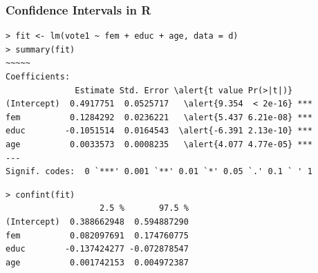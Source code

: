 \documentclass[xcolor=svgnames,9pt,english,aspectratio=169,t]{beamer}
\begin{document}

\begin{frame}[fragile]
\frametitle{Confidence Intervals in R}

\begin{Verbatim}[fontsize=\footnotesize, frame=single, label=R Code, commandchars=\\\{\}]
> fit <- lm(vote1 ~ fem + educ + age, data = d)
> summary(fit)
~~~~~
Coefficients:
              Estimate Std. Error \alert{t value Pr(>|t|)}
(Intercept)  0.4917751  0.0525717   \alert{9.354  < 2e-16} ***
fem          0.1284292  0.0236221   \alert{5.437 6.21e-08} ***
educ        -0.1051514  0.0164543  \alert{-6.391 2.13e-10} ***
age          0.0033573  0.0008235   \alert{4.077 4.77e-05} ***
---
Signif. codes:  0 `***' 0.001 `**' 0.01 `*' 0.05 `.' 0.1 ` ' 1
\end{Verbatim}

\medskip

\begin{Verbatim}[fontsize=\footnotesize, frame=single, label=R Code, commandchars=\\\{\}]
> confint(fit)
                   2.5 %       97.5 %
(Intercept)  0.388662948  0.594887290
fem          0.082097691  0.174760775
educ        -0.137424277 -0.072878547
age          0.001742153  0.004972387
\end{Verbatim}

\end{frame}
\end{document}
